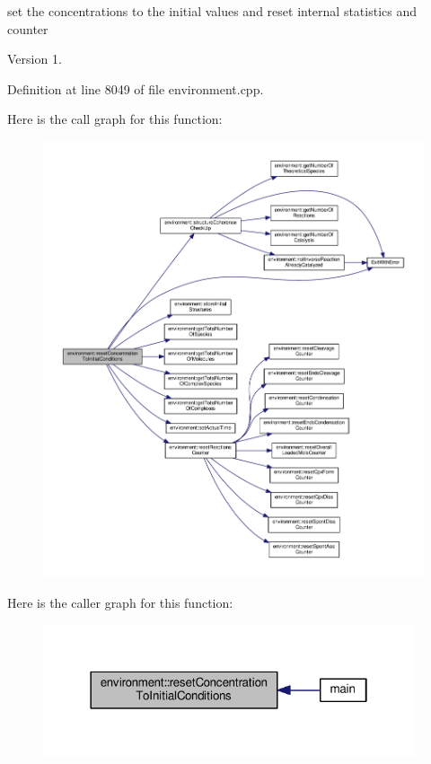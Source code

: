 set the concentrations to the initial values and reset internal statistics and counter 

\begin{DoxyVersion}{Version}
1. 
\end{DoxyVersion}


Definition at line 8049 of file environment.\-cpp.



Here is the call graph for this function\-:\nopagebreak
\begin{figure}[H]
\begin{center}
\leavevmode
\includegraphics[width=350pt]{a00011_ad8000316befe74598a123bdcd7024697_cgraph}
\end{center}
\end{figure}




Here is the caller graph for this function\-:\nopagebreak
\begin{figure}[H]
\begin{center}
\leavevmode
\includegraphics[width=310pt]{a00011_ad8000316befe74598a123bdcd7024697_icgraph}
\end{center}
\end{figure}


